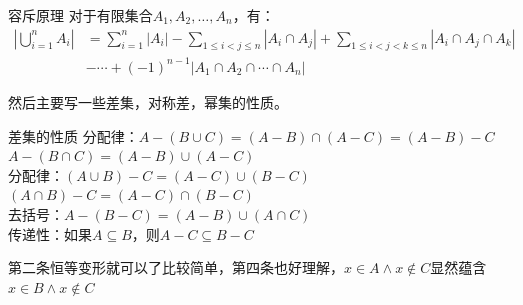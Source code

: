 \documentclass[lang=cn,11pt]{elegantbook}
\begin{document}
\begin{theorem}{容斥原理}
对于有限集合$A_1, A_2, \ldots, A_n$，有：
\begin{align*}
\left|\bigcup_{i=1}^n A_i\right| &= \sum_{i=1}^n |A_i| 
                               - \sum_{1 \leq i < j \leq n} |A_i \cap A_j| + \sum_{1 \leq i < j < k \leq n} |A_i \cap A_j \cap A_k| \\
                               &- \cdots + (-1)^{n-1} |A_1 \cap A_2 \cap \cdots \cap A_n|
\end{align*}
\end{theorem}
然后主要写一些差集，对称差，幂集的性质。
\begin{theorem}{差集的性质}
分配律：$A - (B \cup C) = (A - B) \cap (A - C)=(A - B) - C$\quad$A - (B \cap C) = (A - B) \cup (A - C)$\\
分配律：$(A \cup B) - C = (A - C) \cup (B - C)$\quad$(A \cap B) - C = (A - C) \cap (B - C)$\\
去括号：$A - (B - C) = (A - B) \cup (A \cap C)$\\
传递性：如果$A \subseteq B$，则$A - C \subseteq B - C$
\end{theorem}
第二条恒等变形就可以了比较简单，第四条也好理解，$x\in A\land x\notin C$显然蕴含$x\in B\land x\notin C$
\end{document}
